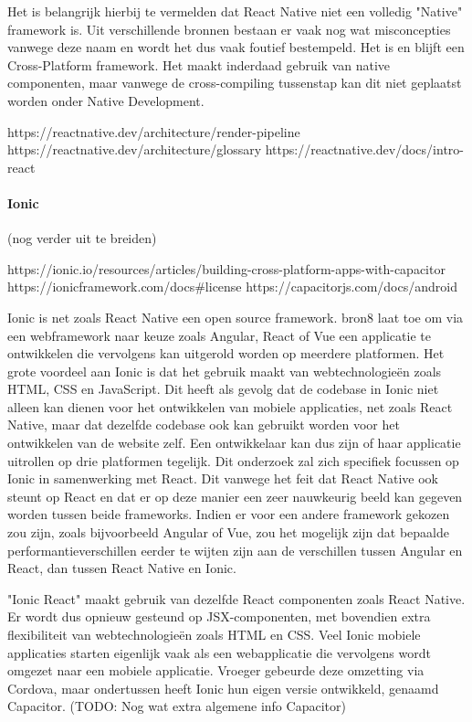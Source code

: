 Het is belangrijk hierbij te vermelden dat React Native niet een volledig "Native" framework is. Uit verschillende bronnen bestaan er vaak nog wat misconcepties vanwege deze naam en wordt het dus vaak foutief bestempeld. Het is en blijft een Cross-Platform framework. Het maakt inderdaad gebruik van native componenten, maar vanwege de cross-compiling tussenstap kan dit niet geplaatst worden onder Native Development.

https://reactnative.dev/architecture/render-pipeline
https://reactnative.dev/architecture/glossary
https://reactnative.dev/docs/intro-react

\paragraph{Ionic}

(nog verder uit te breiden)

https://ionic.io/resources/articles/building-cross-platform-apps-with-capacitor
https://ionicframework.com/docs#license
https://capacitorjs.com/docs/android

Ionic is net zoals React Native een open source framework. {bron8} laat toe om via een webframework naar keuze zoals Angular, React of Vue een applicatie te ontwikkelen die vervolgens kan uitgerold worden op meerdere platformen. Het grote voordeel aan Ionic is dat het gebruik maakt van webtechnologieën zoals HTML, CSS en JavaScript. Dit heeft als gevolg dat de codebase in Ionic niet alleen kan dienen voor het ontwikkelen van mobiele applicaties, net zoals React Native, maar dat dezelfde codebase ook kan gebruikt worden voor het ontwikkelen van de website zelf. Een ontwikkelaar kan dus zijn of haar applicatie uitrollen op drie platformen tegelijk. Dit onderzoek zal zich specifiek focussen op Ionic in samenwerking met React. Dit vanwege het feit dat React Native ook steunt op React en dat er op deze manier een zeer nauwkeurig beeld kan gegeven worden tussen beide frameworks. Indien er voor een andere framework gekozen zou zijn, zoals bijvoorbeeld Angular of Vue, zou het mogelijk zijn dat bepaalde performantieverschillen eerder te wijten zijn aan de verschillen tussen Angular en React, dan tussen React Native en Ionic.

"Ionic React" maakt gebruik van dezelfde React componenten zoals React Native. Er wordt dus opnieuw gesteund op JSX-componenten, met bovendien extra flexibiliteit van webtechnologieën zoals HTML en CSS. Veel Ionic mobiele applicaties starten eigenlijk vaak als een webapplicatie die vervolgens wordt omgezet naar een mobiele applicatie. Vroeger gebeurde deze omzetting via Cordova, maar ondertussen heeft Ionic hun eigen versie ontwikkeld, genaamd Capacitor. (TODO: Nog wat extra algemene info Capacitor)

